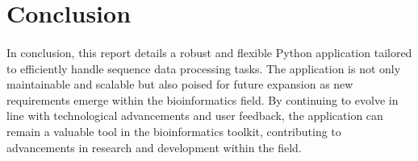 \documentclass[12pt]{article}
\begin{document}
\section{Conclusion}
\paragraph{}
In conclusion, this report details a robust and flexible Python application tailored to efficiently handle sequence data processing tasks. The application is not only maintainable and scalable but also poised for future expansion as new requirements emerge within the bioinformatics field. By continuing to evolve in line with technological advancements and user feedback, the application can remain a valuable tool in the bioinformatics toolkit, contributing to advancements in research and development within the field.
\end{document}
